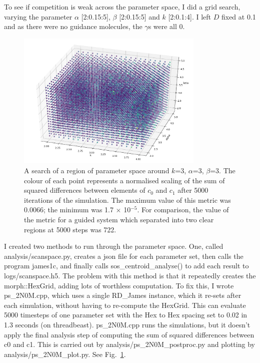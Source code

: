 \documentclass[11pt, a4paper]{article}
\newcommand{\code}[1]{\textsf{#1}}
\begin{document}
To see if competition is weak across the parameter space, I did a grid
search, varying the parameter $\alpha$ [2:0.15:5], $\beta$ [2:0.15:5]
and $k$ [2:0.1:4]. I left $D$ fixed at 0.1 and as there were no
guidance molecules, the $\gamma$s were all 0.

\begin{figure}[htb!]
\centering
\includegraphics[width=0.8\textwidth]{./plots/ps_2N0M.png}
\caption[Parameter space search.]
{A search of a region of parameter space around $k$=3, $\alpha$=3,
$\beta$=3. The colour of each point represents a normalised scaling of
the sum of squared differences between elements of $c_0$ and $c_1$
after 5000 iterations of the simulation. The maximum value of this
metric was 0.0066; the minimum was 1.7 $\times$ 10$^{-5}$. For
comparison, the value of the metric for a guided system which
separated into two clear regions at 5000 steps was 722.}
\label{fig:ps_2N0M}
\end{figure}

I created two methods to run through the parameter space. One, called
\code{analysis/scanspace.py}, creates a json file for each parameter set, then
calls the program \code{james1c}, and finally
calls \code{sos\_centroid\_analyse()} to add each result
to \code{logs/scanspace.h5}. The problem with this method is that it
repeatedly creates the \code{morph::HexGrid}, adding lots of worthless
computation. To fix this, I wrote \code{ps\_2N0M.cpp}, which uses a
single \code{RD\_James} instance, which it re-sets after each
simulation, without having to re-compute the HexGrid. This can
evaluate 5000 timesteps of one parameter set with the Hex to Hex
spacing set to 0.02 in 1.3 seconds (on
threadbeast). \code{ps\_2N0M.cpp} runs the simulations, but it doesn't
apply the final analysis step of computing the sum of squared
differences between c0 and c1. This is carried out by
\code{analysis/ps\_2N0M\_postproc.py} and plotting by
\code{analysis/ps\_2N0M\_plot.py}. See Fig.~\ref{fig:ps_2N0M}.
\end{document}
